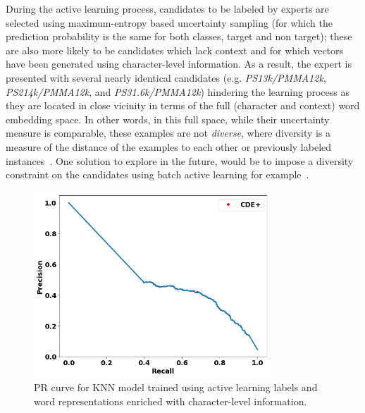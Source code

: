 During the active learning process, candidates to be labeled by experts are selected using maximum-entropy based uncertainty sampling (for which the prediction probability is the same for both classes, target and non target);
these are also more likely to be candidates which lack context and for which vectors have been generated using character-level information. 
As a result, the expert is presented with several nearly identical candidates (e.g. \textit{PS13k/PMMA12k}, \textit{PS214k/PMMA12k}, and \textit{PS31.6k/PMMA12k}) hindering the learning process as they are located in close vicinity in terms of the full (character and context) word embedding space.
In other words, in this full space, while their uncertainty measure is comparable, these examples are not \textit{diverse}, where diversity is a measure of the distance of the examples to each other or previously labeled instances~\cite{brinker2003incorporating}.
One solution to explore in the future, would be to impose a diversity constraint on the candidates using batch active learning for example~\cite{settles2009active}.


\begin{figure}
\centering
\includegraphics[trim=0in 0.1in 0.1in 0.in,clip,width=3.5in]{figures/fasttext_prc_al_corpus_round5_100}
\caption{PR curve for KNN model trained using active learning labels and word representations enriched with character-level information.}\label{fig:UBS_prcs_fasttext}
\end{figure}











